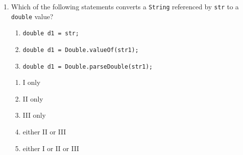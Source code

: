 \documentclass[CS180-S16-FinalExam.tex]{subfiles}
\begin{document}
\begin{enumerate}
\section*{One Point Questions}
\label{sec:one}



\item  Which of the following statements converts a \texttt{String} referenced by \texttt{str} to a \texttt{double} value? 
\begin{enumerate}[I]
\item \texttt{double d1 = str;}
\item \texttt{double d1 = Double.valueOf(str1);}
\item \texttt{double d1 = Double.parseDouble(str1);}
\end{enumerate}

\begin{enumerate}
\item I only
\item II only
\item III only
\item either II or III \ifdraft \Ans \fi
\item either I or II or III 
\end{enumerate}


\end{enumerate}
\end{document}
